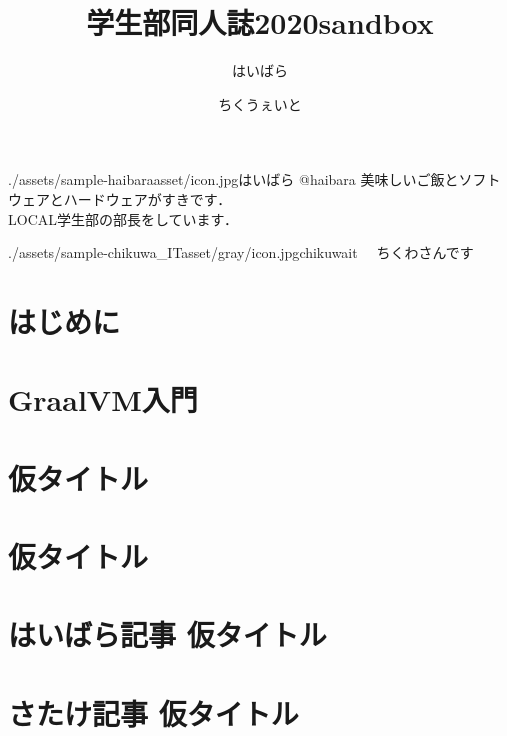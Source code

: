 \documentclass[autodetect-engine,dvipdfmx-if-dvi,ja=standard,b5paper,10.5pt,twoside,openany,layout=v2]{bxjsbook}
\title{学生部同人誌2020sandbox}
\author{はいばら \and ちくうぇいと }
\date{}
\newcommand{\articlepath}{./articles}
\newcommand{\assetspath}{./assets}
\newcommand{\chikuwaitasset}{\assetspath/sample-chikuwa_ITasset/gray}
\newcommand{\haibaraasset}{\assetspath/sample-haibaraasset}
\begin{document}
\frontmatter
\maketitle
\begin{myintroduce}{\haibaraasset/icon.jpg}{はいばら @haibara}
  美味しいご飯とソフトウェアとハードウェアがすきです．\\
  LOCAL学生部の部長をしています．
\end{myintroduce}
\begin{myintroduce}{\chikuwaitasset/icon.jpg}{chikuwait}
　ちくわさんです
\end{myintroduce}


\chapter{はじめに}
\addtolength{\oddsidemargin}{10pt}
\addtolength{\evensidemargin}{-10pt}


\tableofcontents
\mainmatter

\chapter{GraalVM入門}


\chapter{仮タイトル}


\chapter{仮タイトル}


\chapter{はいばら記事 仮タイトル}


\chapter{さたけ記事 仮タイトル}

\end{document}
